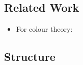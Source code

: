 \documentclass[../MasterThesis.tex]{subfiles}
\begin{document}
	
	
	
	
	
	
	
	
	
	
	
	\subsection{Related Work} \label{subsection:relatedwork}
	
	\begin{itemize}
		\item For colour theory: \cite{colourRGB}
	\end{itemize}
	
	
	
	
	
	
	
	
	
	
	\subsection{Structure} \label{subsection:structure}
	
	
	
	
	
	

	
	

	
	
	
\end{document}
